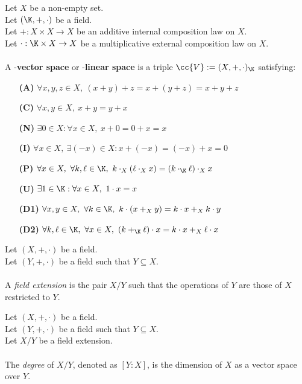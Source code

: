 \begin{definition-pre}
    \label{def:vector_space}
    Let $X$ be a non-empty set. \\
    Let $(\K,+,\cdot)$ be a field. \\
    Let $+: X\times X \to X$ be an additive internal composition law on $X$. \\
    Let $\cdot: \K\times X \to X$ be a multiplicative external composition law on $X$. \\\\
    A \K-\textbf{vector space} or \K-\textbf{linear space} is a triple $\cc{V}:= (X, +, \cdot)_{\K}$ satisfying:
    \begin{enumerate}
        \item [\textbf{(A)}] $\forall x,y,z\in X,\ (x+y)+z= x+(y+z) = x+y+z$
        \item [\textbf{(C)}] $\forall x,y\in X,\ x+y = y+x$
        \item [\textbf{(N)}] $\exists 0 \in X : \forall x \in X,\ x+0 = 0+x = x$
        \item [\textbf{(I)}] $\forall x \in X,\ \exists (-x)\in X: x+(-x) = (-x)+x = 0$
        \item [\textbf{(P)}] $\forall x \in X,\ \forall k,\ell \in \K,\ k\cdot_X(\ell\cdot_X x)= (k\cdot_{\K}\ell)\cdot_X x$
        \item [\textbf{(U)}] $\exists 1 \in \K : \forall x \in X,\ 1\cdot x = x$
        \item [\textbf{(D1)}] $\forall x,y \in X,\ \forall k\in \K,\ k\cdot(x+_Xy)=k\cdot x+_Xk\cdot y$
        \item [\textbf{(D2)}] $\forall k,\ell \in \K,\ \forall x\in X,\ (k+_\K\ell)\cdot x=k\cdot x+_X\ell\cdot x$
    \end{enumerate}
\end{definition-pre}

\begin{definition-pre}
    \label{def:field_extension}
    Let $(X, +, \cdot)$ be a field. \\
    Let $(Y, +, \cdot)$ be a field such that $Y \subseteq X$. \\\\
    A \textit{field extension} is the pair $X/Y$ such that the operations of $Y$
    are those of $X$ restricted to $Y$.
\end{definition-pre}

\begin{definition-pre}
    \label{def:degree_field_extension}
    Let $(X, +, \cdot)$ be a field. \\
    Let $(Y, +, \cdot)$ be a field such that $Y \subseteq X$. \\
    Let $X/Y$ be a field extension. \\\\
    The \textit{degree} of $X/Y$, denoted as $[Y:X]$, is the dimension of $X$ as a vector space over $Y$.
\end{definition-pre}

